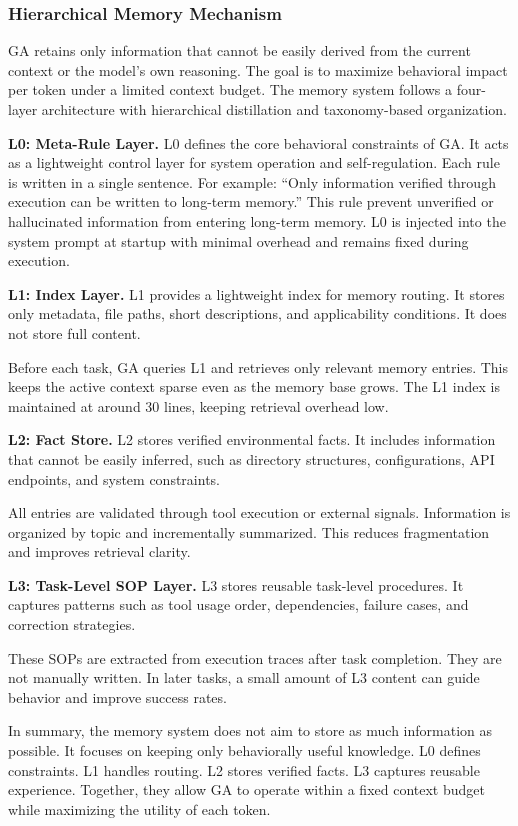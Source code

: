 \subsubsection{Hierarchical Memory Mechanism}
\label{sec:momory}

GA retains only information that cannot be easily derived from the current context or the model’s own reasoning. The goal is to maximize behavioral impact per token under a limited context budget. The memory system follows a four-layer architecture with hierarchical distillation and taxonomy-based organization.

\textbf{L0: Meta-Rule Layer.}  L0 defines the core behavioral constraints of GA. It acts as a lightweight control layer for system operation and self-regulation. Each rule is written in a single sentence. For example: ``Only information verified through execution can be written to long-term memory.'' This rule prevent unverified or hallucinated information from entering long-term memory. L0 is injected into the system prompt at startup with minimal overhead and remains fixed during execution.

\textbf{L1: Index Layer.} L1 provides a lightweight index for memory routing. It stores only metadata, file paths, short descriptions, and applicability conditions. It does not store full content.

Before each task, GA queries L1 and retrieves only relevant memory entries. This keeps the active context sparse even as the memory base grows. The L1 index is maintained at around 30 lines, keeping retrieval overhead low.

\textbf{L2: Fact Store.}  L2 stores verified environmental facts. It includes information that cannot be easily inferred, such as directory structures, configurations, API endpoints, and system constraints.

All entries are validated through tool execution or external signals. Information is organized by topic and incrementally summarized. This reduces fragmentation and improves retrieval clarity.

\textbf{L3: Task-Level SOP Layer.} L3 stores reusable task-level procedures. It captures patterns such as tool usage order, dependencies, failure cases, and correction strategies.

These SOPs are extracted from execution traces after task completion. They are not manually written. In later tasks, a small amount of L3 content can guide behavior and improve success rates.

In summary, the memory system does not aim to store as much information as possible. It focuses on keeping only behaviorally useful knowledge. L0 defines constraints. L1 handles routing. L2 stores verified facts. L3 captures reusable experience. Together, they allow GA to operate within a fixed context budget while maximizing the utility of each token.

